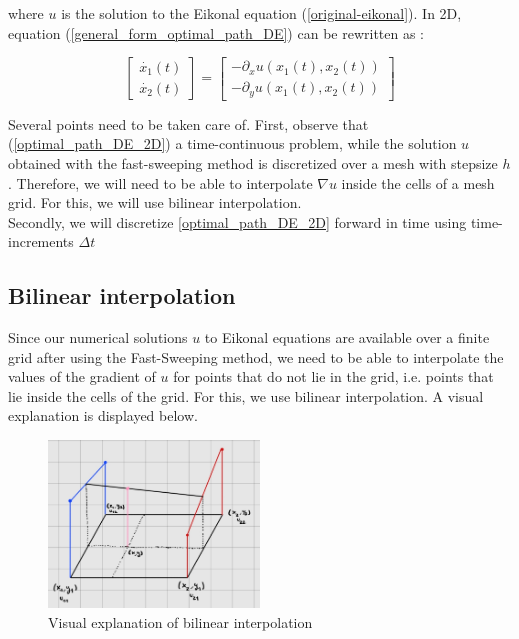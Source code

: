 \documentclass[11pt]{article}
\theoremstyle{definition}
\theoremstyle{remark}
\begin{document}
\noindent where $u$ is the solution to the Eikonal equation (\ref{original-eikonal}). In 2D, equation (\ref{general_form_optimal_path_DE}) can be rewritten as : 

\begin{equation}
\label{optimal_path_DE_2D}
    \begin{bmatrix}
        \dot{x_1}(t) \\
        \dot{x_2}(t)
    \end{bmatrix} = \begin{bmatrix}
        -\partial_xu(x_1(t),x_2(t)) \\
        -\partial_yu(x_1(t),x_2(t))
    \end{bmatrix}
\end{equation}

\noindent Several points need to be taken care of. First, observe that (\ref{optimal_path_DE_2D}) a time-continuous problem, while the solution $u$ obtained with the fast-sweeping method is discretized over a mesh with stepsize $h$. Therefore, we will need to be able to interpolate $\nabla u$ inside the cells of a mesh grid. For this, we will use bilinear interpolation.
\\
Secondly, we will discretize \ref{optimal_path_DE_2D} forward in time using time-increments $\Delta t$ 

\subsection{Bilinear interpolation}
Since our numerical solutions $u$ to Eikonal equations are available over a finite grid after using the Fast-Sweeping method, we need to be able to interpolate the values of the gradient of $u$ for points that do not lie in the grid, i.e. points that lie inside the cells of the grid. For this, we use bilinear interpolation. A visual explanation is displayed below.

\begin{figure}[h]
  \centering
  \includegraphics[width=0.5\textwidth]{bilinear_interpolation.jpg}
  \caption{Visual explanation of bilinear interpolation}
  \label{fig:your_label}
\end{figure}
\end{document}
